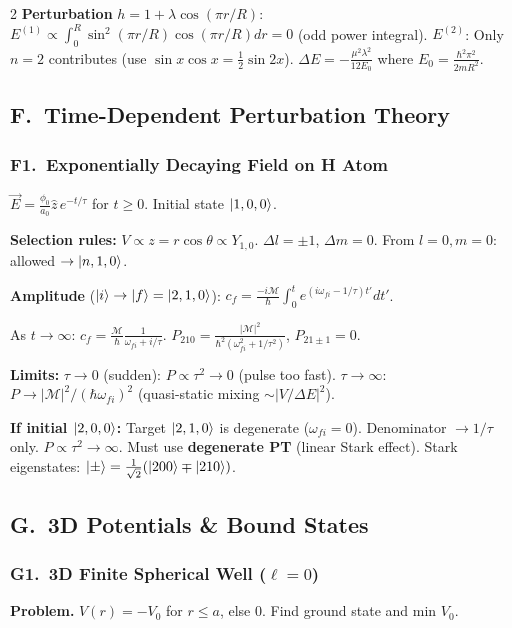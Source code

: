 \documentclass[9pt,a4paper]{article} %
\begin{document}
\begin{multicols}{2}
\textbf{Perturbation} $h=1+\lambda\cos(\pi r/R)$:
$E^{(1)}\propto\int_0^R\sin^2(\pi r/R)\cos(\pi r/R)dr=0$ (odd power integral).
$E^{(2)}$: Only $n=2$ contributes (use $\sin x\cos x=\frac{1}{2}\sin 2x$).
$\boxed{\Delta E=-\frac{\mu^2\lambda^2}{12 E_0}}$ where $E_0=\frac{\hbar^2\pi^2}{2mR^2}$.

\subsection{F.\ Time-Dependent Perturbation Theory}

\subsubsection{F1.\ Exponentially Decaying Field on H Atom}
$\vec{E}=\frac{\phi_0}{a_0}\hat{z}\,e^{-t/\tau}$ for $t\ge 0$.\; Initial state $\ket{1,0,0}$.

\textbf{Selection rules:} $V\propto z=r\cos\theta\propto Y_{1,0}$.\;
$\Delta l=\pm 1$, $\Delta m=0$.\;
From $l=0,m=0$: allowed $\to \ket{n,1,0}$.

\textbf{Amplitude} ($\ket{i}\to\ket{f}=\ket{2,1,0}$):
$c_f=\frac{-i\mathcal{M}}{\hbar}\int_0^t e^{(i\omega_{fi}-1/\tau)t'}dt'$.

As $t\to\infty$: $c_f=\frac{\mathcal{M}}{\hbar}\frac{1}{\omega_{fi}+i/\tau}$.\;
$\boxed{P_{210}=\frac{|\mathcal{M}|^2}{\hbar^2(\omega_{fi}^2+1/\tau^2)}}$,\; $P_{21\pm 1}=0$.

\textbf{Limits:}
$\tau\to 0$ (sudden): $P\propto\tau^2\to 0$ (pulse too fast).
$\tau\to\infty$: $P\to|\mathcal{M}|^2/(\hbar\omega_{fi})^2$ (quasi-static mixing $\sim |V/\Delta E|^2$).

\textbf{If initial $\ket{2,0,0}$:} Target $\ket{2,1,0}$ is degenerate ($\omega_{fi}=0$).
Denominator $\to 1/\tau$ only. $P\propto\tau^2\to\infty$.\;
Must use \textbf{degenerate PT} (linear Stark effect).
Stark eigenstates: $\ket{\pm}=\frac{1}{\sqrt{2}}(\ket{200}\mp\ket{210})$.

\subsection{G.\ 3D Potentials \& Bound States}

\subsubsection{G1.\ 3D Finite Spherical Well ($\ell=0$)}
\textbf{Problem.} $V(r)=-V_0$ for $r\le a$, else $0$. Find ground state and min $V_0$.


\end{multicols}
\end{document}
